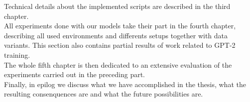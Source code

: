 Technical details about the implemented scripts are described in the third chapter.\\

All experiments done with our models take their part in the fourth chapter, describing all used environments and differents setups together with data variants. This section also contains partial results of work related to GPT-2 training.\\

The whole fifth chapter is then dedicated to an extensive evaluation of the experiments carried out in the preceding part.\\

Finally, in epilog we discuss what we have accomplished in the thesis, what the resulting consenquences are and what the future possibilities are.